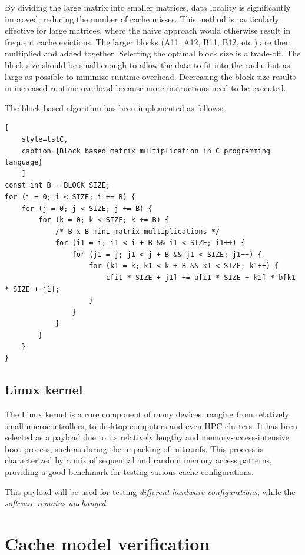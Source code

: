 \noindent By dividing the large matrix into smaller matrices, data locality is significantly improved, reducing the number of cache misses. This method is particularly effective for
large matrices, where the naive approach would otherwise result in frequent cache evictions. The larger blocks (A11, A12, B11, B12, etc.) are then multiplied and added together.
Selecting the optimal block size is a trade-off. The block size should be small enough to allow the data to fit into the cache but as large as possible to minimize runtime
overhead. Decreasing the block size results in increased runtime overhead because more instructions need to be executed.

\noindent The block-based algorithm has been implemented as follows:
\begin{center}
\centering
\begin{minipage}{\linewidth}
\begin{lstlisting}[
	style=lstC,
    caption={Block based matrix multiplication in C programming language}
    ]
const int B = BLOCK_SIZE;
for (i = 0; i < SIZE; i += B) {
	for (j = 0; j < SIZE; j += B) {
		for (k = 0; k < SIZE; k += B) {
			/* B x B mini matrix multiplications */
			for (i1 = i; i1 < i + B && i1 < SIZE; i1++) {
				for (j1 = j; j1 < j + B && j1 < SIZE; j1++) {
					for (k1 = k; k1 < k + B && k1 < SIZE; k1++) {
						c[i1 * SIZE + j1] += a[i1 * SIZE + k1] * b[k1 * SIZE + j1];
					}
				}
			}
		}
	}
}
\end{lstlisting}
\end{minipage}
\end{center}

\subsection{Linux kernel}
The Linux kernel is a core component of many devices, ranging from relatively small microcontrollers, to desktop computers and even HPC clusters.
It has been selected as a payload due to its relatively lengthy and memory-access-intensive boot process, such as during the unpacking of initramfs. This process is
characterized by a mix of sequential and random memory access patterns, providing a good benchmark for testing various cache configurations.

\noindent This payload will be used for testing \textit{different hardware configurations}, while the \textit{software remains unchanged}.

\section{Cache model verification}

